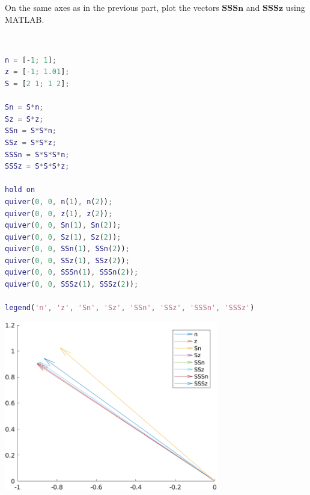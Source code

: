 On the same axes as in the previous part, plot the vectors $\boldsymbol{SSSn}$ and $\boldsymbol{SSSz}$ using MATLAB.

\begin{solution} \
    \begin{lstlisting}[language=Matlab]
n = [-1; 1];
z = [-1; 1.01];
S = [2 1; 1 2];

Sn = S*n;
Sz = S*z;
SSn = S*S*n;
SSz = S*S*z;
SSSn = S*S*S*n;
SSSz = S*S*S*z;

hold on
quiver(0, 0, n(1), n(2));
quiver(0, 0, z(1), z(2));
quiver(0, 0, Sn(1), Sn(2));
quiver(0, 0, Sz(1), Sz(2));
quiver(0, 0, SSn(1), SSn(2));
quiver(0, 0, SSz(1), SSz(2));
quiver(0, 0, SSSn(1), SSSn(2));
quiver(0, 0, SSSz(1), SSSz(2));

legend('n', 'z', 'Sn', 'Sz', 'SSn', 'SSz', 'SSSn', 'SSSz')
    \end{lstlisting}
    \begin{center}
        \includegraphics[width=0.7\textwidth]{img/e8p4.png}
    \end{center}
\end{solution}